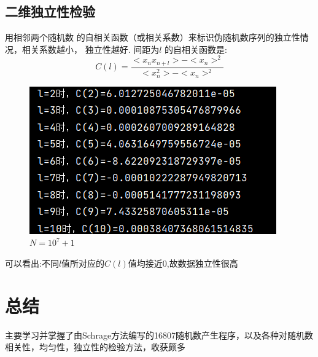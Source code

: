 \documentclass[UTF8]{ctexart}
\begin{document}
\subsection{二维独立性检验}
用相邻两个随机数
的自相关函数（或相关系数）来标识伪随机数序列的独立性情况，相关系数越小，
独立性越好.
间距为$l$ 的自相关函数是:
\begin{equation}
    C(l)=\frac{<x_nx_{n+l}>-<x_n>^2}{<x_n^2>-<x_n>^2}
\end{equation}
\begin{figure}[H]
    \centering
    \includegraphics[scale=0.5]{10^7关联.png}
    \caption{$N=10^7+1$}
\end{figure}

可以看出:不同$l$值所对应的$C(l)$值均接近0,故数据独立性很高

\section{总结}
主要学习并掌握了由Schrage方法编写的16807随机数产生程序，以及各种对随机数相关性，均匀性，独立性的检验方法，收获颇多
\end{document}
